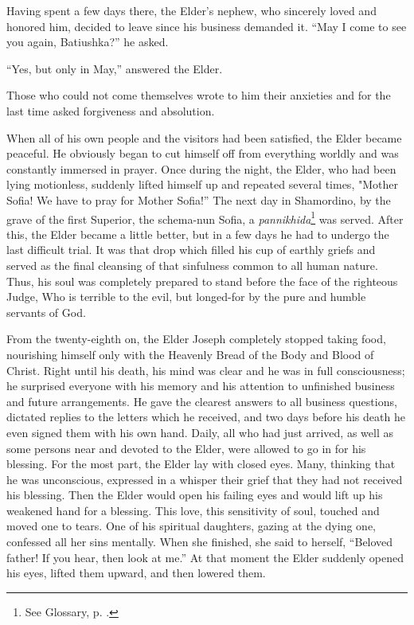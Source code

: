 Having spent a few days there, the Elder's nephew, who sincerely loved and honored him, decided to leave since his business demanded it. “May I come to see you again, Batiushka?” he asked.

“Yes, but only in May,” answered the Elder.

Those who could not come themselves wrote to him their anxieties and for the last time asked forgiveness and absolution.

When all of his own people and the visitors had been satisfied, the Elder became peaceful. He obviously began to cut himself off from everything worldly and was constantly immersed in prayer. Once during the night, the Elder, who had been lying motionless, suddenly lifted himself up and repeated several times, "Mother Sofia! We have to pray for Mother Sofia!” The next day in Shamordino, by the grave of the first Superior, the schema-nun Sofia, a \textit{pannikhida}\footnote{See Glossary, p. \pageref{pannikhida}.} was served. After this, the Elder became a little better, but in a few days he had to undergo the last difficult trial. It was that drop which filled his cup of earthly griefs and served as the final cleansing of that sinfulness common to all human nature. Thus, his soul was completely prepared to stand before the face of the righteous Judge, Who is terrible to the evil, but longed-for by the pure and humble servants of God.

From the twenty-eighth on, the Elder Joseph completely stopped taking food, nourishing himself only with the Heavenly Bread of the Body and Blood of Christ. Right until his death, his mind was clear and he was in full consciousness; he surprised everyone with his memory and his attention to unfinished business and future arrangements. He gave the clearest answers to all business questions, dictated replies to the letters which he received, and two days before his death he even signed them with his own hand. Daily, all who had just arrived, as well as some persons near and devoted to the Elder, were allowed to go in for his blessing. For the most part, the Elder lay with closed eyes. Many, thinking that he was unconscious, expressed in a whisper their grief that they had not received his blessing. Then the Elder would open his failing eyes and would lift up his weakened hand for a blessing. This love, this sensitivity of soul, touched and moved one to tears. One of his spiritual daughters, gazing at the dying one, confessed all her sins mentally. When she finished, she said to herself, “Beloved father! If you hear, then look at me.” At that moment the Elder suddenly opened his eyes, lifted them upward, and then lowered them.

